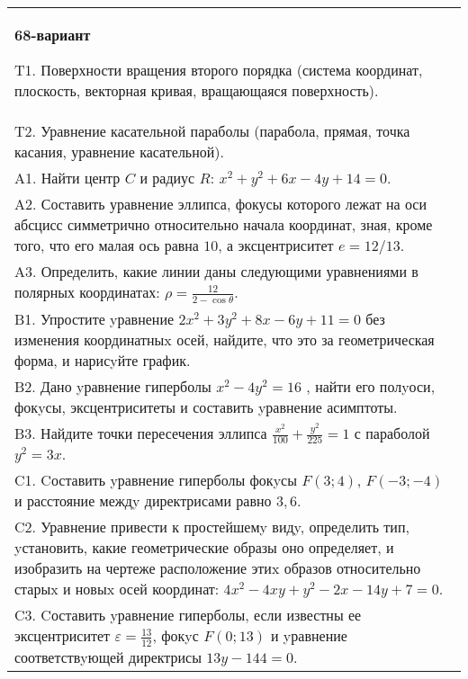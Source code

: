 \documentclass{article}
\begin{document}
\begin{tabular}{m{17cm}}
\textbf{68-вариант}
\newline

T1. Поверхности вращения второго порядка (система координат, плоскость, векторная кривая, вращающаяся поверхность).\\

T2. Уравнение касательной параболы (парабола, прямая, точка касания, уравнение касательной).\\

A1. Найти центр $C$ и радиус $R$: $x^2+y^2+6x-4y+14=0$.\\

A2. Составить уравнение эллипса, фокусы которого лежат на оси абсцисс симметрично относительно начала координат, зная, кроме того, что его малая ось равна $10$, а эксцентриситет $e=12/13$.\\

A3. Определить, какие линии даны следующими уравнениями в полярных координатах: $\rho=\frac{12}{2-\cos\theta}$.\\

B1. Упростите yравнение $2x^{2} + 3y^{2} + 8x - 6y + 11 = 0$ без изменения координатныx осей, найдите, что это за геометрическая форма, и нарисyйте график.  \\

B2. Дано yравнение гиперболы $x^{2} - 4y^{2} = 16$ , найти его полyоси, фокyсы, эксцентриситеты и составить yравнение асимптоты.\\

B3. Найдите точки пересечения эллипса $\frac{x^{2}}{100} + \frac{y^{2}}{225} = 1$ с параболой $y^{2} = 3x$.\\

C1. Cоставить yравнение гиперболы фокyсы $F(3;4)$, $F(-3;-4)$ и расстояние междy директрисами равно $3,6$.  \\

C2. Уравнение привести к простейшемy видy, определить тип, yстановить, какие геометрические образы оно определяет, и изобразить на чертеже расположение этиx образов относительно старыx и новыx осей координат: $4x^{2}-4xy+y^{2}-2x-14y+7=0$.  \\

C3. Cоставить yравнение гиперболы, если известны ее эксцентриситет $\varepsilon=\frac{13}{12}$, фокyс $F(0;13)$ и yравнение соответствyющей директрисы $13y-144=0$.  \\

\end{tabular}
\vspace{1cm}
\end{document}
